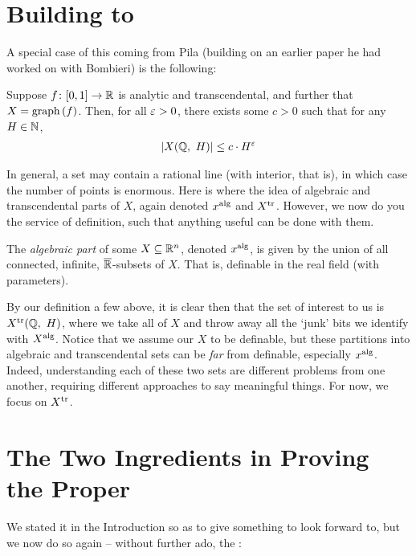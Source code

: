 \section{Building to \pw}

A special case of this coming from Pila (building on an earlier paper he had worked on with Bombieri) is the following:

\begin{theorem}
  Suppose $\funcdom{f}{[0, 1]}{\R}$ is analytic and transcendental, and further that $X = \graph{f}$. Then, for all $\eps > 0$, there exists some $c > 0$ such that for any $H \in \N$,
    \begin{align*}
      \card{\XQH[H]} \leq c \cdot H^{\eps}
    \end{align*}
\end{theorem}

In general, a  set may contain a rational line (with interior, that is), in which case the number of points is enormous. Here is where the idea of algebraic and transcendental parts of $X$, again denoted $\Xalg[x]$ and $\Xtr[X]$. However, we now do you the service of definition, such that anything useful can be done with them.

\begin{definition}
  The \emph{algebraic part} of some $\XRn[X]{n}$, denoted $\Xalg[x]$, is given by the union of all connected, infinite, $\overline{\R}$- subsets of $X$. That is, definable in the real field (with parameters).
\end{definition}

By our definition a few above, it is clear then that the set of interest to us is $\XtrQH[H]$, where we take all of $X$ and throw away all the `junk' bits we identify with $\Xalg[X]$. Notice that we assume our $X$ to be definable, but these partitions into algebraic and transcendental sets can be \emph{far} from definable, especially $\Xalg[x]$. Indeed, understanding each of these two sets are different problems from one another, requiring different approaches to say meaningful things. For now, we focus on $\Xtr[X]$.

\section{The Two Ingredients in Proving the \pwT Proper}

We stated it in the Introduction so as to give something to look forward to, but we now do so again -- without further ado, the \pwt:

